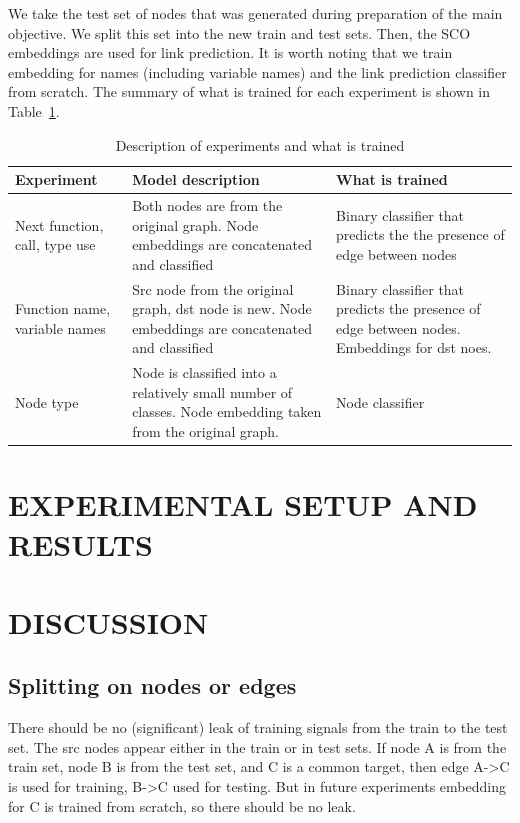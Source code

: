 \documentclass[a4paper,twoside]{article}
\begin{document}
We take the test set of nodes that was generated during preparation of the main objective. We split this set into the new train and test sets. Then, the SCO embeddings are used for link prediction. It is worth noting that we train embedding for names (including variable names) and the link prediction classifier from scratch. The summary of what is trained for each experiment is shown in Table~\ref{tbl:experiment_desc}.

\begin{table}
    \centering
    \caption{Description of experiments and what is trained}\label{tbl:experiment_desc}
    \begin{tabular}{|p{3cm}|p{6cm}|p{6cm}|}
    \toprule
        \textbf{Experiment} & \textbf{Model description} & \textbf{What is trained} \\ \midrule
        Next function, call, type use & Both nodes are from the original graph. Node embeddings are concatenated and classified & Binary classifier that predicts the the presence of edge between nodes \\ \midrule
        Function name, variable names & Src node from the original graph, dst node is new. Node embeddings are concatenated and classified & Binary classifier that predicts the presence of edge between nodes. Embeddings for dst noes. \\ \midrule
        Node type & Node is classified into a relatively small number of classes. Node embedding taken from the original graph. & Node classifier \\ \bottomrule
    \end{tabular}
\end{table}



\section{\uppercase{Experimental Setup and Results}}


\section{\uppercase{Discussion}}

\subsection{Splitting on nodes or edges}

There should be no (significant) leak of training signals from the train to the test set. The src nodes appear either in the train or in test sets. If node A is from the train set, node B is from the test set, and C is a common target, then edge A->C is used for training, B->C used for testing. But in future experiments embedding for C is trained from scratch, so there should be no leak.
\end{document}
